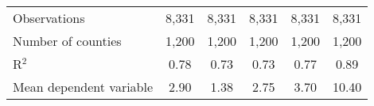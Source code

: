 {\begin{tabular}{l*{5}{c}}
\midrule
Observations        &       8,331         &       8,331         &       8,331         &       8,331         &       8,331         \\
Number of counties  &       1,200         &       1,200         &       1,200         &       1,200         &       1,200         \\
R$^2$               &        0.78         &        0.73         &        0.73         &        0.77         &        0.89         \\
Mean dependent variable&        2.90         &        1.38         &        2.75         &        3.70         &       10.40         \\
\bottomrule
\end{tabular}
}
